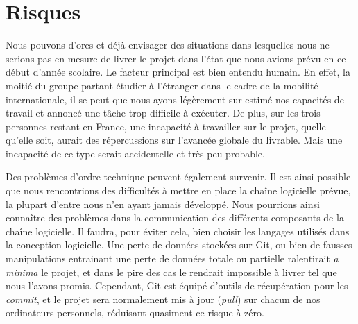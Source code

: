 \section{Risques}
    Nous pouvons d'ores et déjà envisager des situations dans lesquelles nous ne serions pas en mesure de livrer le projet dans l'état que nous avions prévu en ce début d'année scolaire.
    Le facteur principal est bien entendu humain. En effet, la moitié du groupe partant étudier à l'étranger dans le cadre de la mobilité internationale, il se peut que nous ayons légèrement sur-estimé nos capacités de travail et annoncé une tâche trop difficile à exécuter. De plus, sur les trois personnes restant en France, une incapacité à travailler sur le projet, quelle qu'elle soit, aurait des répercussions sur l'avancée globale du livrable. Mais une incapacité de ce type serait accidentelle et très peu probable.
    
    Des problèmes d'ordre technique peuvent également survenir. Il est ainsi possible que nous rencontrions des difficultés à mettre en place la chaîne logicielle prévue, la plupart d'entre nous n'en ayant jamais développé. Nous pourrions ainsi connaître des problèmes dans la communication des différents composants de la chaîne logicielle. Il faudra, pour éviter cela, bien choisir les langages utilisés dans la conception logicielle.
    Une perte de données stockées sur Git, ou bien de fausses manipulations entrainant une perte de données totale ou partielle ralentirait \textit{a minima} le projet, et dans le pire des cas le rendrait impossible à livrer tel que nous l'avons promis. Cependant, Git est équipé d'outils de récupération pour les \textit{commit}, et le projet sera normalement mis à jour (\textit{pull}) sur chacun de nos ordinateurs personnels, réduisant quasiment ce risque à zéro.

